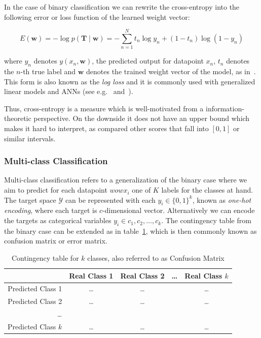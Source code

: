 In the case of binary classification we can rewrite the cross-entropy into the following error or loss function of the learned weight vector:

\begin{equation}
  E(\mathbf{w}) =  -\log p(\mathbf{T} \mid \mathbf{w}) = - \sum_{n=1}^N {t_n \log y_n + (1 - t_n) \log (1 - y_n)}
\end{equation}

where $y_n$ denotes $y(x_n, \mathbf{w})$, the predicted output for datapoint $x_n$, $t_n$ denotes the $n$-th true label and $\mathbf{w}$ denotes the trained weight vector of the model, as in~\cite[Chapter 4.3.2, p.~205 ]{Bishop:2006aa}. This form is also known as the \emph{log loss} and it is commonly used with generalized linear models and \glspl{ANN} (see e.g.~\cite[Chapter 4.3.2, p.~205 ]{Bishop:2006aa} and~\cite[Chapter 10.7, p.~251 ]{Alpaydin:2014aa}).

Thus, cross-entropy is a measure which is well-motivated from a information-theoretic perspective. On the downside it does not have an upper bound which makes it hard to interpret, as compared other scores that fall into $[0, 1]$ or similar intervals.

\subsubsection*{Multi-class Classification}
\label{subs:Multi-class Classification}

Multi-class classification refers to a generalization of the binary case where we aim to predict for each datapoint $wowx_i$ one of $K$ labels for the classes at hand. The target space $\mathcal{Y}$ can be represented with each $y_i \in \{ 0,1 \}^k$, known as \emph{one-hot encoding}, where each target is $c$-dimensional vector. Alternatively we can encode the targets as categorical variables $y_i \in {c_1, c_2, \ldots, c_k}$. The contingency table from the binary case can be extended as in table~\ref{table:contingency-table-k}, which is then commonly known as
\gls{confusion matrix} or \gls{error matrix}.

\begin{center}
  \begin{table}[h]
  \begin{tabular}{r | c c c c }
    & Real Class 1 & Real Class 2 & \ldots & Real Class $k$ \\
    \hline
    Predicted Class 1    & \ldots & \ldots & & \ldots \\
    Predicted Class 2    & \ldots & \ldots & & \ldots \\
    \ldots               & & & & \\
    Predicted Class $k$  & \ldots & \ldots & & \ldots \\
  \end{tabular}
  \caption{Contingency table for $k$ classes, also referred to as Confusion Matrix}
\label{table:contingency-table-k}
\end{table}
\end{center}

